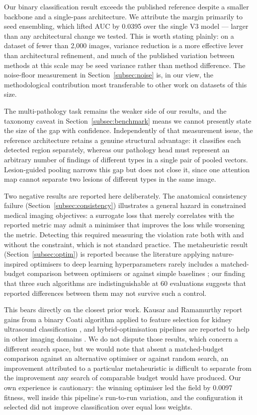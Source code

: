 \documentclass[pdflatex,sn-mathphys-num]{sn-jnl}
\theoremstyle{thmstyleone}%
\theoremstyle{thmstyletwo}%
\theoremstyle{thmstylethree}%
\begin{document}
Our binary classification result exceeds the published reference despite a smaller backbone and
a single-pass architecture. We attribute the margin primarily to seed ensembling, which lifted
AUC by 0.0395 over the single V3 model --- larger than any architectural change we tested. This
is worth stating plainly: on a dataset of fewer than 2,000 images, variance reduction is a more
effective lever than architectural refinement, and much of the published variation between
methods at this scale may be seed variance rather than method difference. The noise-floor
measurement in Section~\ref{subsec:noise} is, in our view, the methodological contribution most
transferable to other work on datasets of this size.

The multi-pathology task remains the weaker side of our results, and the taxonomy caveat in
Section~\ref{subsec:benchmark} means we cannot presently state the size of the gap with
confidence. Independently of that measurement issue, the reference architecture retains a
genuine structural advantage: it classifies each detected region separately, whereas our
pathology head must represent an arbitrary number of findings of different types in a single
pair of pooled vectors. Lesion-guided pooling narrows this gap but does not close it, since one
attention map cannot separate two lesions of different types in the same image.

Two negative results are reported here deliberately. The anatomical consistency failure
(Section~\ref{subsec:consistency}) illustrates a general hazard in constrained medical imaging
objectives: a surrogate loss that merely correlates with the reported metric may admit a
minimiser that improves the loss while worsening the metric. Detecting this required measuring
the violation rate both with and without the constraint, which is not standard practice. The
metaheuristic result (Section~\ref{subsec:optim}) is reported because the literature applying
nature-inspired optimisers to deep learning hyperparameters rarely includes a matched-budget
comparison between optimisers or against simple baselines \cite{bib_randomsearch}; our finding
that three such algorithms are indistinguishable at 60 evaluations suggests that reported
differences between them may not survive such a control.

This bears directly on the closest prior work. Kausar and Ramamurthy report gains from a binary
Coati algorithm applied to feature selection for kidney ultrasound classification
\cite{bib_coatikidney}, and hybrid-optimisation pipelines are reported to help in other imaging
domains \cite{bib_dentalopt}. We do not dispute those results, which concern a different search
space, but we would note that absent a matched-budget comparison against an alternative optimiser
or against random search, an improvement attributed to a particular metaheuristic is difficult to
separate from the improvement any search of comparable budget would have produced. Our own
experience is cautionary: the winning optimiser led the field by 0.0097 fitness, well inside this
pipeline's run-to-run variation, and the configuration it selected did not improve classification
over equal loss weights.
\end{document}
